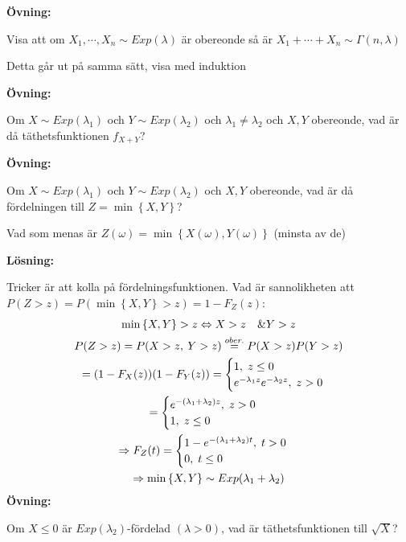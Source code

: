 \noindent\textbf{Övning:}\par
\noindent Visa att om $X_1,\cdots,X_n\sim Exp(\lambda)$ är obereonde så är $X_1+\cdots+X_n\sim\Gamma(n,\lambda)$\par
\noindent Detta går ut på samma sätt, visa med induktion
\par\bigskip
\noindent\textbf{Övning:}\par
\noindent Om $X\sim Exp(\lambda_1)$ och $Y\sim Exp(\lambda_2)$ och $\lambda_1\neq\lambda_2$ och $X,Y$ obereonde, vad är då täthetsfunktionen $f_{X+Y}$?
\par\bigskip
\noindent\textbf{Övning:}\par
\noindent Om $X\sim Exp(\lambda_1)$ och $Y\sim Exp(\lambda_2)$ och $X,Y$ obereonde, vad är då fördelningen till $Z=\min\left\{X,Y\right\}$?\par
\noindent Vad som menas är $Z(\omega) = \min\left\{X(\omega), Y(\omega)\right\}$ (minsta av de)
\par\bigskip
\noindent\textbf{Lösning:}\par
\noindent Tricker är att kolla på fördelningsfunktionen. Vad är sannolikheten att $P(Z>z) = P(\min\left\{X,Y\right\}>z) = 1-F_Z(z)$:
\begin{equation*}
  \begin{gathered}
    \min\left\{X,Y\right\}>z\Leftrightarrow X>z\quad\& Y>z\\
    P(Z>z) = P(X>z,\:Y>z)\stackrel{ober.}{=}P(X>z)P(Y>z)\\
    =(1-F_X(z))(1-F_Y(z)) = \begin{cases}1,\;z\leq0\\e^{-\lambda_1z}e^{-\lambda_2z},\;z>0\end{cases}\\
    = \begin{cases}e^{-(\lambda_1+\lambda_2)z},\;z>0\\1,\;z\leq0\end{cases}\\
    \Rightarrow F_Z(t) = \begin{cases}1-e^{-(\lambda_1+\lambda_2)t},\;t>0\\0,\;t\leq0\end{cases}\\
  \Rightarrow\min\left\{X,Y\right\}\sim Exp(\lambda_1+\lambda_2)
  \end{gathered}
\end{equation*}
\newpage
\noindent\textbf{Övning:}\par
\noindent  Om $X\leq0$ är $Exp(\lambda_2)$-fördelad $(\lambda>0)$, vad är täthetsfunktionen till $\sqrt{X}$?
